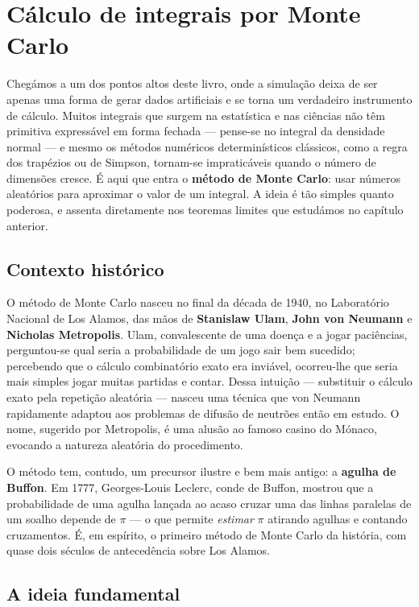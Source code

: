 \documentclass[
  portuguese,
  11pt,
  openany]{book}
\begin{document}
\chapter{Cálculo de integrais por Monte Carlo}\label{calculo-integrais}

Chegámos a um dos pontos altos deste livro, onde a simulação deixa de ser apenas
uma forma de gerar dados artificiais e se torna um verdadeiro instrumento de
cálculo. Muitos integrais que surgem na estatística e nas ciências não têm
primitiva expressável em forma fechada --- pense-se no integral da densidade
normal --- e mesmo os métodos numéricos determinísticos clássicos, como a regra
dos trapézios ou de Simpson, tornam-se impraticáveis quando o número de
dimensões cresce. É aqui que entra o \textbf{método de Monte Carlo}: usar números
aleatórios para aproximar o valor de um integral. A ideia é tão simples quanto
poderosa, e assenta diretamente nos teoremas limites que estudámos no capítulo
anterior.

\section{Contexto histórico}\label{contexto-histuxf3rico-2}

O método de Monte Carlo nasceu no final da década de 1940, no Laboratório
Nacional de Los Alamos, das mãos de \textbf{Stanislaw Ulam}, \textbf{John von Neumann} e
\textbf{Nicholas Metropolis}. Ulam, convalescente de uma doença e a jogar paciências,
perguntou-se qual seria a probabilidade de um jogo sair bem sucedido; percebendo
que o cálculo combinatório exato era inviável, ocorreu-lhe que seria mais
simples jogar muitas partidas e contar. Dessa intuição --- substituir o cálculo
exato pela repetição aleatória --- nasceu uma técnica que von Neumann rapidamente
adaptou aos problemas de difusão de neutrões então em estudo. O nome, sugerido
por Metropolis, é uma alusão ao famoso casino do Mónaco, evocando a natureza
aleatória do procedimento.

O método tem, contudo, um precursor ilustre e bem mais antigo: a \textbf{agulha de
Buffon}. Em 1777, Georges-Louis Leclerc, conde de Buffon, mostrou que a
probabilidade de uma agulha lançada ao acaso cruzar uma das linhas paralelas de
um soalho depende de \(\pi\) --- o que permite \emph{estimar} \(\pi\) atirando agulhas e
contando cruzamentos. É, em espírito, o primeiro método de Monte Carlo da
história, com quase dois séculos de antecedência sobre Los Alamos.

\section{A ideia fundamental}\label{a-ideia-fundamental}
\end{document}
